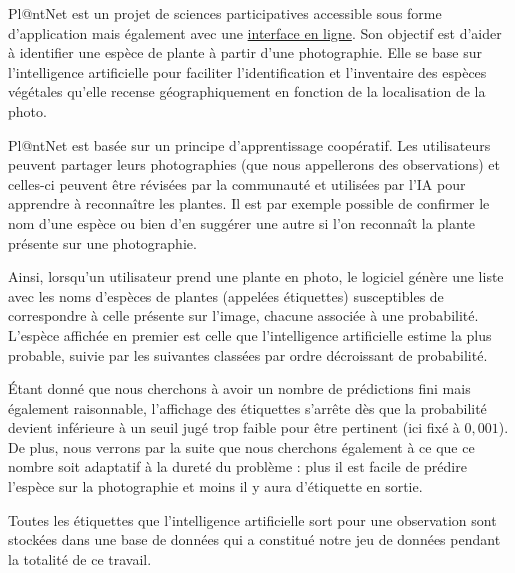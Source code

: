 \documentclass[a4paper,12pt]{article}
\begin{document}
Pl@ntNet est un projet de sciences participatives accessible sous forme d’application mais également avec une \href{https://identify.plantnet.org/fr}{interface en ligne}. Son objectif est d'aider à identifier une espèce de plante à partir d'une photographie. Elle se base sur l’intelligence artificielle pour faciliter l’identification et l’inventaire des espèces végétales qu'elle recense géographiquement en fonction de la localisation de la photo.

\vspace{0.2cm}

Pl@ntNet est basée sur un principe d’apprentissage coopératif. Les utilisateurs peuvent partager leurs photographies (que nous appellerons des observations) et celles-ci peuvent être révisées par la communauté et utilisées par l’IA pour apprendre à reconnaître les plantes. Il est par exemple possible de confirmer le nom d’une espèce ou bien d'en suggérer une autre si l’on reconnaît la plante présente sur une photographie.

\vspace{0.2cm}

Ainsi, lorsqu'un utilisateur prend une plante en photo, le logiciel génère une liste avec les noms d'espèces de plantes (appelées étiquettes) susceptibles de correspondre à celle présente sur l'image, chacune associée à une probabilité. L'espèce affichée en premier est celle que l'intelligence artificielle estime la plus probable, suivie par les suivantes classées par ordre décroissant de probabilité. 

\vspace{0.2cm}

Étant donné que nous cherchons à avoir un nombre de prédictions fini mais également raisonnable, l'affichage des étiquettes s'arrête dès que la probabilité devient inférieure à un seuil jugé trop faible pour être pertinent (ici fixé à $0,001$). De plus, nous verrons par la suite que nous cherchons également à ce que ce nombre soit adaptatif à la dureté du problème : plus il est facile de prédire l'espèce sur la photographie et moins il y aura d'étiquette en sortie.

\vspace{0.2cm}

Toutes les étiquettes que l'intelligence artificielle sort pour une observation sont stockées dans une base de données qui a constitué notre jeu de données pendant la totalité de ce travail.

\end{document}
